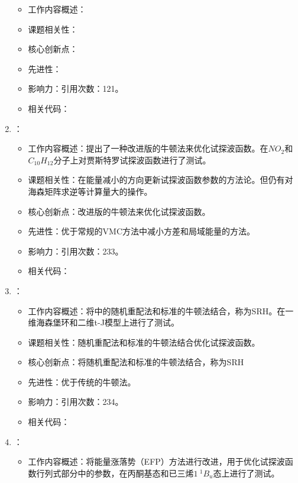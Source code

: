 \begin{enumerate}
\begin{itemize}
                \item 工作内容概述：
                \item 课题相关性：
                \item 核心创新点：
                \item 先进性：
                \item 影响力：引用次数：121。
                \item 相关代码：
            \end{itemize}
        \item \citet{umrigar2005energy}：
            \begin{itemize}
                \item 工作内容概述：提出了一种改进版的牛顿法来优化试探波函数。在$NO_2$和$C_{10}H_{12}$分子上对贾斯特罗试探波函数进行了测试。
                \item 课题相关性：在能量减小的方向更新试探波函数参数的方法论。但仍有对海森矩阵求逆等计算量大的操作。
                \item 核心创新点：改进版的牛顿法来优化试探波函数。
                \item 先进性：优于常规的VMC方法中减小方差和局域能量的方法。
                \item 影响力：引用次数：233。
                \item 相关代码：
            \end{itemize}
            \item \citet{sorella2005wave}：
            \begin{itemize}
                \item 工作内容概述：将\citet{casula2004correlated}中的随机重配法和标准的牛顿法结合，称为SRH。在一维海森堡环和二维t-J模型上进行了测试。
                \item 课题相关性：随机重配法和标准的牛顿法结合优化试探波函数。
                \item 核心创新点：将随机重配法和标准的牛顿法结合，称为SRH
                \item 先进性：优于传统的牛顿法。
                \item 影响力：引用次数：234。
                \item 相关代码：
            \end{itemize}
        \item \citet{scemama2006simple}：
            \begin{itemize}
                \item 工作内容概述：将能量涨落势（EFP）方法进行改进，用于优化试探波函数行列式部分中的参数，在丙酮基态和已三烯$1~^{1}B_u$态上进行了测试。

\end{itemize}
\end{enumerate}
